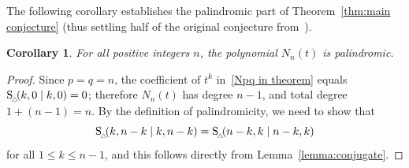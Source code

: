 \documentclass[11pt]{amsart}
\theoremstyle{plain}
\newtheorem{corollary}[theorem]{Corollary}
\theoremstyle{definition}
\numberwithin{equation}{section}
\newcommand{\Stri}{{\rm S}_{_{\!\triangle\!\!}}}
\begin{document}
The following corollary establishes the palindromic part of Theorem~\ref{thm:main conjecture} (thus settling half of the original conjecture from~\cite{BW}).

\begin{corollary}
\label{cor:main}
    For all positive integers $n$, the polynomial $N_{n}(t)$ is palindromic. 
\end{corollary}

\begin{proof}
    Since $p=q=n$, the coefficient of $t^k$ in~\eqref{Npq in theorem} equals $\Stri(k,0 \mid k,0) = 0$; therefore $N_n(t)$ has degree $n-1$, and total degree $1 + (n-1) = n$.
    By the definition of palindromicity, we need to show that 
    \[
    \Stri(k, n-k \mid k, n-k) =  \Stri(n-k, k \mid n-k, k)
    \]
    for all $1 \leq k \leq n-1$, and this follows directly from Lemma~\ref{lemma:conjugate}.
\end{proof}
\end{document}
